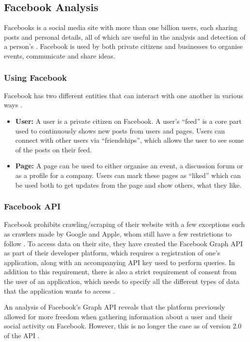 \subsection{Facebook Analysis}\label{sec:facebook-analysis}
Facebooks is a social media site with more than one billion users, each sharing
posts and personal details, all of which are useful in the analysis and
detection of a person's \fbp. Facebook is used by both private citizens and
businesses to organise events, communicate and share ideas.

\subsubsection{Using Facebook}
Facebook has two different entities that can interact with one another in
various ways \Source.

\begin{itemize}
  \item \textbf{User:} A user is a private citizen on Facebook. A user's
  ``feed'' is a core part used to continuously shows new posts from users and
  pages. Users can connect with other users via ``friendships'', which allows
  the user to see some of the posts on their feed.
  \item \textbf{Page:} A page can be used to either organise an event, a
  discussion forum or as a profile for a company. Users can mark these pages as
  ``liked'' which can be used both to get updates from the page and show others,
  what they like.
\end{itemize}


\subsubsection{Facebook API}
Facebook prohibits crawling/scraping of their website with a few exceptions such
as crawlers made by Google and Apple, whom still have a few restrictions to
follow \citep{FacebookRobotsTxt}. To access data on their site, they have
created the Facebook Graph \ac{API} as part of their developer platform, which
requires a registration of one's application, along with an accompanying
\ac{API} key used to perform queries. In addition to this requirement, there is
also a strict requirement of consent from the user of an application, which
needs to specify all the different types of data that the application wants to
access \citep{FacebookGraphApiAccessTokens,facebookPolicy}.\nl

An analysis of Facebook's Graph \ac{API} \citep{FacebookGraphApiDocumentation}
reveals that the platform previously allowed for more freedom when gathering
information about a user and their social activity on Facebook. However, this is
no longer the case as of version 2.0 of the \ac{API}
\citep{FacebookChangesInGraphTwoPointOh}.


